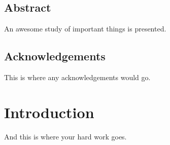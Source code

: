 \documentclass[oneside, letterpaper, 12pt, oldfontcommands]{memoir}
\newcommand{\myabstract}{%
An awesome study of important things is presented.
}
\begin{document}
\frontmatter


\thetitlepage
\clearpage

\thecopyrightpage
\clearpage

\cleardoublepage
\setcounter{page}{1}

\section{Abstract}
\myabstract
\clearpage

\section{Acknowledgements}
This is where any acknowledgements would go.
\clearpage

\tableofcontents %

\mainmatter

\chapter{Introduction}
And this is where your hard work goes.
\end{document}
